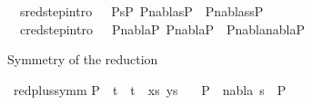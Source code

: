 \begin{isabellebody}
\ \ sred{\isacharunderscore}{\kern0pt}step{\isacharbrackleft}{\kern0pt}intro{\isacharbang}{\kern0pt}{\isacharbrackright}{\kern0pt}{\isacharcolon}{\kern0pt}\ \ \ {\isachardoublequoteopen}{\isasymlbrakk}P{}{\isasymturnstile}s{}{\isasymleadsto}P{}{\isacharsemicolon}{\kern0pt}\ P{}{\isasymTurnstile}{\isacharparenleft}{\kern0pt}nabla{}{\isacharcomma}{\kern0pt}s{}{\isacharparenright}{\kern0pt}{\isasymRightarrow}P{}{\isasymrbrakk}\ {\isasymLongrightarrow}\ P{}{\isasymTurnstile}{\isacharparenleft}{\kern0pt}nabla{}{\isacharcomma}{\kern0pt}{\isacharparenleft}{\kern0pt}s{}{\isasymbullet}s{}{\isacharparenright}{\kern0pt}{\isacharparenright}{\kern0pt}{\isasymRightarrow}P{}{\isachardoublequoteclose}\ {\isacharbar}{\kern0pt}\isanewline
\ \ cred{\isacharunderscore}{\kern0pt}step{\isacharbrackleft}{\kern0pt}intro{\isacharbang}{\kern0pt}{\isacharbrackright}{\kern0pt}{\isacharcolon}{\kern0pt}\ \ \ {\isachardoublequoteopen}{\isasymlbrakk}P{}{\isasymturnstile}nabla{}{\isasymrightarrow}P{}{\isacharsemicolon}{\kern0pt}\ P{}{\isasymTurnstile}{\isacharparenleft}{\kern0pt}nabla{}{\isacharcomma}{\kern0pt}{\isacharbrackleft}{\kern0pt}{\isacharbrackright}{\kern0pt}{\isacharparenright}{\kern0pt}{\isasymRightarrow}P{}{\isasymrbrakk}\ {\isasymLongrightarrow}\ P{}{\isasymTurnstile}{\isacharparenleft}{\kern0pt}nabla{}{\isasymunion}nabla{}{\isacharcomma}{\kern0pt}{\isacharbrackleft}{\kern0pt}{\isacharbrackright}{\kern0pt}{\isacharparenright}{\kern0pt}{\isasymRightarrow}P{}{\isachardoublequoteclose}%
\begin{isamarkuptext}%
Symmetry of the reduction%
\end{isamarkuptext}\isamarkuptrue%
\isamarkupfalse%
\ red{\isacharunderscore}{\kern0pt}plus{\isacharunderscore}{\kern0pt}symm{\isacharcolon}{\kern0pt}\isanewline
{}P{}\ {\isacharequal}{\kern0pt}\ {\isacharparenleft}{\kern0pt}{\isacharparenleft}{\kern0pt}t{}\ {\isasymapprox}{\isacharquery}{\kern0pt}\ t{}{\isacharparenright}{\kern0pt}\ {\isacharhash}{\kern0pt}\ xs{\isacharcomma}{\kern0pt}\ ys{\isacharparenright}{\kern0pt}{\isachardoublequoteclose}\isanewline
\ \ \ {\isachardoublequoteopen}P{}\ {\isasymTurnstile}\ {\isacharparenleft}{\kern0pt}nabla{\isacharcomma}{\kern0pt}\ s{\isacharparenright}{\kern0pt}\ {\isasymRightarrow}\ P{}{\isachardoublequoteclose}\isanewline

\end{isabellebody}
